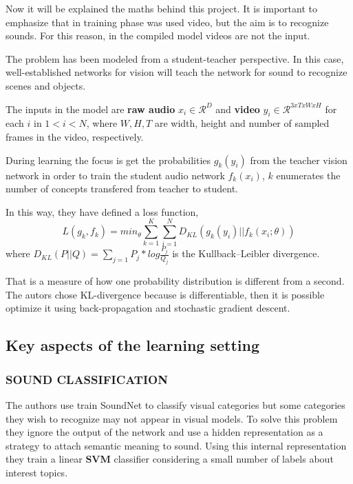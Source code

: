 \documentclass[11pt]{article}
\begin{document}
Now it will be explained the maths behind this project. It is important
to emphasize that in training phase was used video, but the aim is to
recognize sounds. For this reason, in the compiled model videos are not
the input.

The problem has been modeled from a student-teacher perspective. In this
case, well-established networks for vision will teach the network for
sound to recognize scenes and objects.

The inputs in the model are \textbf{raw audio} \(x_i \in \mathcal{R}^D\)
and \textbf{video} \(y_i \in \mathcal{R}^{3xTxWxH}\) for each
\textbf{\(i\)} in \(1<i<N\), where \(W,H,T\) are width, height and
number of sampled frames in the video, respectively.

During learning the focus is get the probabilities \(g_k(y_i)\) from the
teacher vision network in order to train the student audio network
\(f_k(x_i)\), \textbf{\(k\)} enumerates the number of concepts
transfered from teacher to student.

In this way, they have defined a loss function,
\[L(g_k,f_k)=min_{\theta}\sum_{k=1}^K \sum_{i=1}^N D_{KL}(g_k(y_i)||f_k(x_i;\theta))\]
where \(D_{KL}(P||Q) = \sum_{j=1} P_j*log\frac{P_j}{Q_j}\) is the
Kullback--Leibler divergence.

That is a measure of how one probability distribution is different from
a second. The autors chose KL-divergence because is differentiable, then
it is possible optimize it using back-propagation and stochastic
gradient descent.

    \subsection{Key aspects of the learning
setting}\label{key-aspects-of-the-learning-setting}

\subsubsection{SOUND CLASSIFICATION}\label{sound-classification}

The authors use train SoundNet to classify visual categories but some
categories they wish to recognize may not appear in visual models. To
solve this problem they ignore the output of the network and use a
hidden representation as a strategy to attach semantic meaning to sound.
Using this internal representation they train a linear \textbf{SVM}
classifier considering a small number of labels about interest topics.
\end{document}
